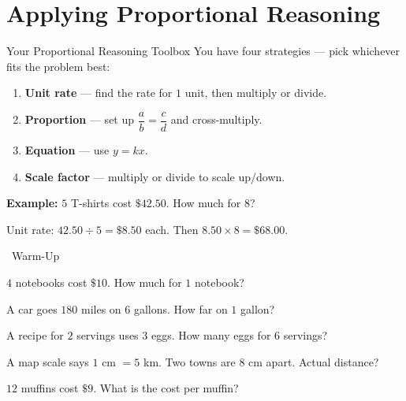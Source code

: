 \section{Applying Proportional Reasoning}

\begin{quickReview}{Your Proportional Reasoning Toolbox}
You have four strategies --- pick whichever fits the problem best:

\begin{enumerate}[leftmargin=*]
    \item \textbf{Unit rate} --- find the rate for $1$ unit, then multiply or divide.
    \item \textbf{Proportion} --- set up $\dfrac{a}{b} = \dfrac{c}{d}$ and cross-multiply.
    \item \textbf{Equation} --- use $y = kx$.
    \item \textbf{Scale factor} --- multiply or divide to scale up/down.
\end{enumerate}

\medskip
\textbf{Example:} $5$ T-shirts cost $\$42.50$. How much for $8$?

Unit rate: $42.50 \div 5 = \$8.50$ each. Then $8.50 \times 8 = \$68.00$.
\end{quickReview}

\begin{practiceBox}[funGreen]{\faSun~Warm-Up}


\prob $4$ notebooks cost $\$10$. How much for $1$ notebook? \answerBlank[3cm]

\prob A car goes $180$ miles on $6$ gallons. How far on $1$ gallon? \answerBlank[3cm]

\prob A recipe for $2$ servings uses $3$ eggs. How many eggs for $6$ servings? \answerBlank[3cm]

\prob A map scale says $1$ cm $= 5$ km. Two towns are $8$ cm apart. Actual distance? \answerBlank[3cm]

\prob $12$ muffins cost $\$9$. What is the cost per muffin? \answerBlank[3cm]
\end{practiceBox}

